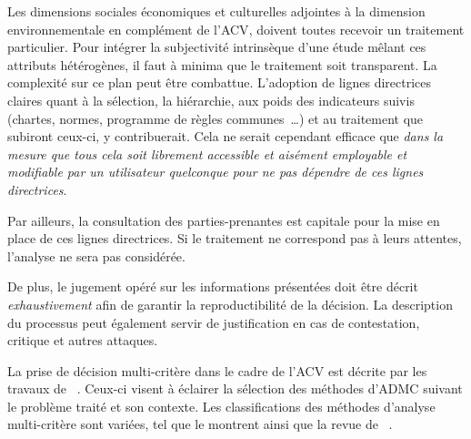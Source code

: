 Les dimensions sociales économiques et culturelles adjointes à la dimension environnementale en complément de l'\gls{ACV}, doivent toutes recevoir un traitement particulier.
Pour intégrer la subjectivité intrinsèque d'une étude mêlant ces attributs hétérogènes, il faut à minima que le traitement soit transparent.
La complexité sur ce plan peut être combattue.
L'adoption de lignes directrices claires quant à la sélection, la hiérarchie, aux poids des indicateurs suivis (chartes, normes, programme de règles communes~\ldots) et au traitement que subiront ceux-ci, y contribuerait.
Cela ne serait cependant efficace que \emph{dans la mesure que tous cela soit librement accessible et aisément 
employable et modifiable par un utilisateur quelconque pour ne pas dépendre de ces lignes directrices}.

Par ailleurs, la consultation des parties-prenantes est capitale pour la mise en place de ces lignes directrices.
Si le traitement ne correspond pas à leurs attentes, l'analyse ne sera pas considérée.

De plus, le jugement opéré sur les informations présentées doit être décrit \emph{exhaustivement} afin de garantir la reproductibilité de la décision.
La description du processus peut également servir de justification en cas de contestation, critique et autres attaques.

La prise de décision multi-critère dans le cadre de l'\gls{ACV} %
est décrite par les travaux de \citeauthor{rowley_aggregating_2012}~\cite{rowley_aggregating_2012}.
Ceux-ci visent à éclairer la sélection des méthodes d'\gls{ADMC} suivant le problème traité et son contexte. %
Les classifications des méthodes d'analyse multi-critère sont variées, tel que le montrent \citeauthor{guitouni_tentative_1998} ainsi que la revue de \citeauthor{herva_review_2013}~\cite{herva_review_2013,guitouni_tentative_1998}.

